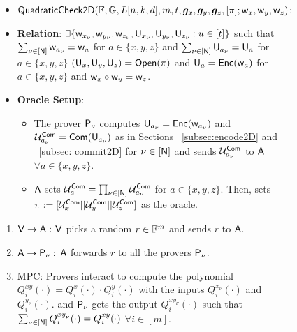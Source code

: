 \begin{figure}[h!]
\centering
	\begin{framed}
			\begin{itemize}
			\item {$\mathsf{QuadraticCheck2D} (\mathbb{F}, \mathbb{G}, L[n,k,d], m, t, \bm{g}_x, \bm{g}_y, \bm{g}_z, [\pi]; \mathsf{w}_x, \mathsf{w}_y, \mathsf{w}_z)$}:
			\item {\bf Relation}: $\exists \{\mathsf{w}_{x_{\nu}}, \mathsf{w}_{y_{\nu}}, \mathsf{w}_{z_{\nu}}, \mathsf{U}_{x_{\nu}}, \mathsf{U}_{y_{\nu}}, \mathsf{U}_{z_{\nu}} : u\in [t]\}$ such that $\sum_{\nu \in [\mathsf{N}]} \mathsf{w}_{a_{\nu}} = \mathsf{w}_a$ for $a\in \{x,y,z\}$ and $\sum_{\nu \in [\mathsf{N}]} \mathsf{U}_{a_{\nu}} = \mathsf{U}_a$ for $a\in \{x,y,z\}$ $(\mathsf{U}_x, \mathsf{U}_y, \mathsf{U}_z) = \mathsf{Open}(\pi)$ and $\mathsf{U}_a = \mathsf{Enc}(\mathsf{w}_a)$ for $a\in \{x,y,z\}$ and $\mathsf{w}_x \circ \mathsf{w}_y = \mathsf{w}_z$.
			\item {\bf Oracle Setup}: 
			\begin{itemize}
				\item The prover $\mathsf{P}_{\nu}$ computes $\mathsf{U}_{a_{\nu}} = \mathsf{Enc}(\mathsf{w}_{a_{\nu}})$ and $\mathcal{U}^{\mathsf{Com}}_{a_{\nu}} = \mathsf{Com}(\mathsf{U}_{a_{\nu}})$ as in Sections ~\ref{subsec:encode2D} and ~\ref{subsec: commit2D} for $\nu \in [\mathsf{N}]$ and sends $\mathcal{U}^{\mathsf{Com}}_{a_{\nu}}$ to $\mathsf{A}$ $\forall a\in \{x,y,z\}$.
				\item $\mathsf{A}$ sets $\mathcal{U}^{\mathsf{Com}}_a = \prod_{\nu \in [\mathsf{N}]} \mathcal{U}^{\mathsf{Com}}_{a_{\nu}}$ for $a\in \{x,y,z\}$. Then, sets $\pi := [\mathcal{U}^{\mathsf{Com}}_x || \mathcal{U}^{\mathsf{Com}}_y || \mathcal{U}^{\mathsf{Com}}_z]$ as the oracle.
			\end{itemize}
		\end{itemize}
		\begin{enumerate}
			\item $\mathsf{V} \rightarrow \mathsf{A} : $ $\mathsf{V}$ picks a random $r\in \mathbb{F}^m$ and sends $r$ to $\mathsf{A}$.
	
			\item $\mathsf{A} \rightarrow \mathsf{P}_{\nu} : $ $\mathsf{A}$ forwards $r$ to all the provers $\mathsf{P}_{\nu}$.
			
			\item MPC:  Provers interact to compute the polynomial $Q^{xy}_i(\cdot) = Q^{x}_i(\cdot)\cdot Q^{y}_i(\cdot)$ with the inputs $Q^{x_{\nu}}_i(\cdot)$ and $Q^{y_{\nu}}_i( \cdot )$. and $\mathsf{P}_{\nu}$ gets the output $Q^{{xy}_{\nu}}_i(\cdot)$ such that $\sum_{\nu \in [\mathsf{N}]} Q^{{xy}_{\nu}}_i(\cdot) = Q^{xy}_i(\cdot)$ $\forall i\in [m]$.
			

\end{enumerate}
\end{framed}
\end{figure}
